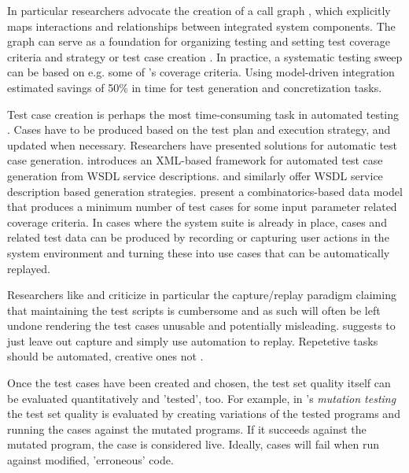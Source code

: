 \documentclass[12pt,a4paper,oneside,pdftex]{report}
\begin{document}
{In particular researchers advocate the creation of a call graph \citep{leung1990study, hurlburt2012not, linnenkugel1990test}, which explicitly maps interactions and relationships between integrated system components. The graph can serve as a foundation for organizing testing and setting test coverage criteria and strategy or test case creation \citep{benz2007combining, hura2011method, linnenkugel1990test}. In practice, a systematic testing sweep can be based on e.g. some of \citeauthor{linnenkugel1990test}'s \citeyearpar{linnenkugel1990test} coverage criteria. Using model-driven integration \citet{wieczorek2010model} estimated savings of 50\% in time for test generation and concretization tasks.

Test case creation is perhaps the most time-consuming task in automated testing \citep{kit1999integrated}. Cases have to be produced based on the test plan and execution strategy, and updated when necessary. Researchers have presented solutions for automatic test case generation. \citet{tsai2002coyote} introduces an XML-based framework for automated test case generation from WSDL service descriptions. \citet{bai2005WSDL} and \citet{di2007web} similarly offer WSDL service description based generation strategies. \citet{dalal1999model} present a combinatorics-based data model that produces a minimum number of test cases for some input parameter related coverage criteria. In cases where the system suite is already in place, cases and related test data can be produced by recording or capturing user actions in the system environment and turning these into use cases that can be automatically replayed.

Researchers like \citet{zallar2001you} and \citet{kit1999integrated} criticize in particular the capture/replay paradigm claiming that maintaining the test scripts is cumbersome and as such will often be left undone rendering the test cases unusable and potentially misleading. \citet{kit1999integrated} suggests to just leave out capture and simply use automation to replay. Repetetive tasks should be automated, creative ones not \citep{pezze2008software}.

Once the test cases have been created and chosen, the test set quality itself can be evaluated quantitatively and 'tested', too. For example, in \citeauthor{delamaro2001interface}'s \citeyearpar{delamaro2001interface} \emph{mutation testing} the test set quality is evaluated by creating variations of the tested programs and running the cases against the mutated programs. If it succeeds against the mutated program, the case is considered live. Ideally, cases will fail when run against modified, 'erroneous' code. 

}
\end{document}
